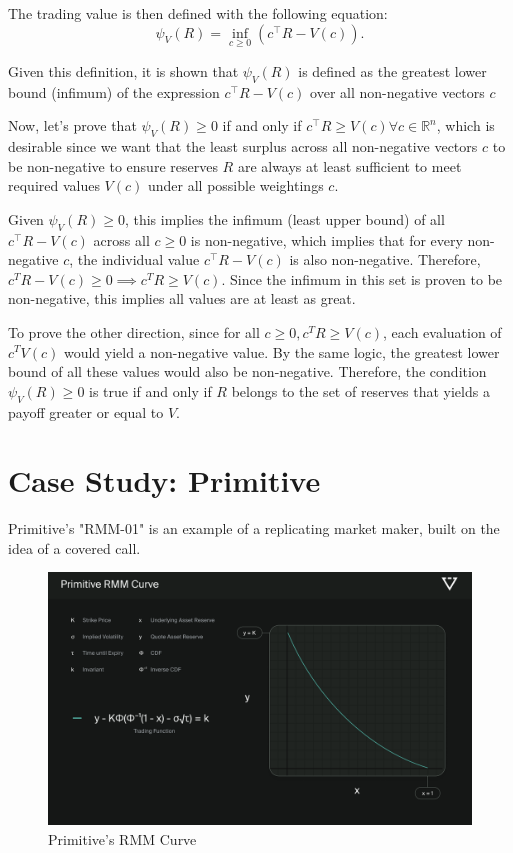 \documentclass[12pt]{article}
\begin{document}
    The trading value is then defined with the following equation:
    \[
        \psi_V\left(R\right) = \inf_{c\geq0}(c^{\intercal}R - V\left(c\right)).\]
    
    Given this definition, it is shown that \(\psi_V\left(R\right)\) is defined as the greatest lower bound (infimum) of the expression \(c^{\intercal}R - V\left(c\right) \) over all non-negative vectors \(c\)

    Now, let's prove that \(\psi_V\left(R\right) \geq 0\) if and only if \(c^{\intercal}R \geq V(c) \forall c \in \mathbb{R}^n\), which is desirable since we want that the least surplus across all non-negative vectors \(c\) to be non-negative to ensure reserves \(R\) are always at least sufficient to meet required values \(V(c)\) under all possible weightings \(c\).

    Given \(\psi_V\left(R\right) \geq 0\), this implies the infimum (least upper bound) of all \(c^{\intercal}R - V\left(c\right)\) across all \(c \geq 0\) is non-negative, which implies that for every non-negative \(c\), the individual value \(c^{\intercal}R - V\left(c\right)\) is also non-negative. Therefore, \(c^TR-V(c) \geq 0 \implies c^TR \geq V(c)\). Since the infimum in this set is proven to be non-negative, this implies all values are at least as great.

    To prove the other direction, since for all \(c \geq 0, c^TR \geq V(c)\), each evaluation of \(c^TV(c)\) would yield a non-negative value. By the same logic, the greatest lower bound of all these values would also be non-negative. Therefore, the condition \(\psi_V\left(R\right) \geq 0\) is true if and only if \(R\) belongs to the set of reserves that yields a payoff greater or equal to \(V\).



\section{Case Study: Primitive}
Primitive's "RMM-01" is an example of a replicating market maker, built on the idea of a covered call.

\begin{figure}[H]
    \centering
    \includegraphics[width=0.8\linewidth]{Primitive.png}
    \caption{Primitive's RMM Curve}
    \label{fig:primitive}
\end{figure}
\end{document}
